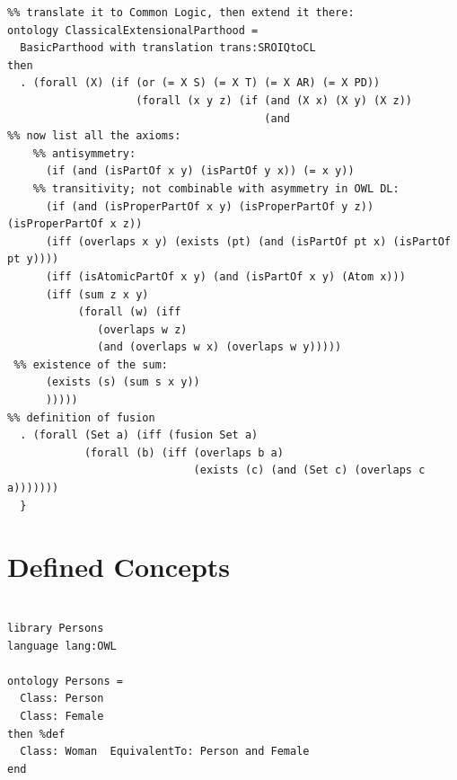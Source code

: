 \documentclass[10pt,fleqn,final]{scrreprt}
\newcommand{\sclause}[1]{\section{#1}}
\begin{document}
\begin{lstlisting}[basicstyle=\ttfamily,language=dolText,alsolanguage=owl2Manchester,alsolanguage=clif,escapechar=@,mathescape]
%% ClassicalExtensionalParthood imports the OWL ontology from above, 
%% translate it to Common Logic, then extend it there:
ontology ClassicalExtensionalParthood =
  BasicParthood with translation trans:SROIQtoCL
then
  . (forall (X) (if (or (= X S) (= X T) (= X AR) (= X PD))
                    (forall (x y z) (if (and (X x) (X y) (X z))
                                        (and                          
%% now list all the axioms: 
	%% antisymmetry:
      (if (and (isPartOf x y) (isPartOf y x)) (= x y)) 
	%% transitivity; not combinable with asymmetry in OWL DL:
      (if (and (isProperPartOf x y) (isProperPartOf y z)) (isProperPartOf x z))
      (iff (overlaps x y) (exists (pt) (and (isPartOf pt x) (isPartOf pt y))))
      (iff (isAtomicPartOf x y) (and (isPartOf x y) (Atom x)))
      (iff (sum z x y)
           (forall (w) (iff 
		   	  (overlaps w z) 
			  (and (overlaps w x) (overlaps w y)))))
 %% existence of the sum:
      (exists (s) (sum s x y))                                          
      )))))
%% definition of fusion	  
  . (forall (Set a) (iff (fusion Set a)                                  
            (forall (b) (iff (overlaps b a)
                             (exists (c) (and (Set c) (overlaps c a)))))))
  }
\end{lstlisting}

\sclause{Defined Concepts}\label{ex:definedconcepts}
\begin{lstlisting}[basicstyle=\ttfamily,language=dolText,alsolanguage=OWL2manchester,escapechar=@,mathescape]
%prefix( lang:  <http://purl.net/DOL/languages/> )%

library Persons
language lang:OWL

ontology Persons =
  Class: Person
  Class: Female
then %def
  Class: Woman  EquivalentTo: Person and Female
end
\end{lstlisting}
\end{document}
